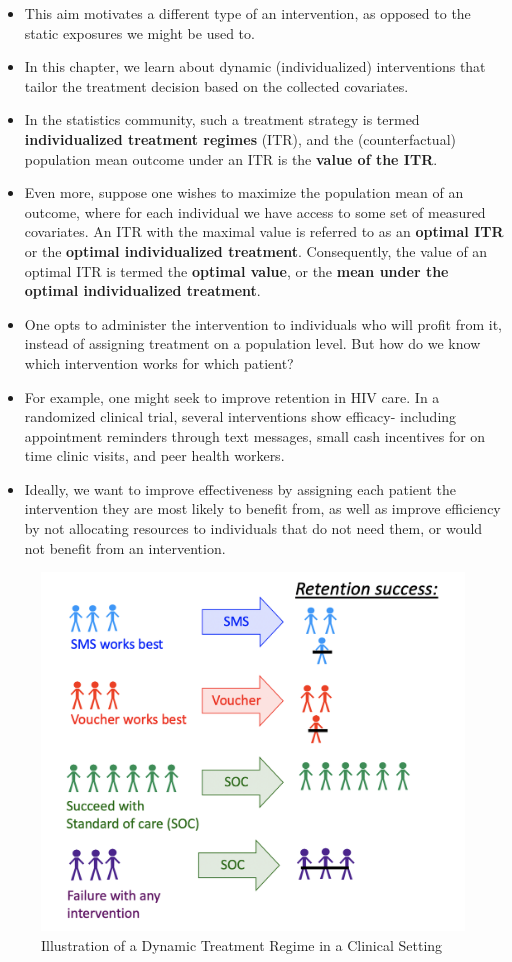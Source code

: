 \documentclass[
  12pt, krantz2,
]{book}
\theoremstyle{definition}
\theoremstyle{definition}
\theoremstyle{definition}
\newcommand{\1}{\mathbbm{1}}
\begin{document}
\begin{itemize}
\item
  This aim motivates a different type of an intervention, as opposed to the static
  exposures we might be used to.
\item
  In this chapter, we learn about dynamic
  (individualized) interventions that tailor the treatment decision based on the
  collected covariates.
\item
  In the statistics community, such a treatment strategy is termed
  \textbf{individualized treatment regimes} (ITR), and the (counterfactual)
  population mean outcome under an ITR is the \textbf{value of the ITR}.
\item
  Even more, suppose one wishes to maximize the population mean of an outcome,
  where for each individual we have access to some set of measured covariates.
  An ITR with the maximal value is referred to as an \textbf{optimal ITR} or the
  \textbf{optimal individualized treatment}. Consequently, the value of an optimal
  ITR is termed the \textbf{optimal value}, or the \textbf{mean under the optimal
  individualized treatment}.
\item
  One opts to administer the intervention to individuals who will profit from
  it, instead of assigning treatment on a population level. But how do we know
  which intervention works for which patient?
\item
  For example, one might seek to improve retention in HIV care. In a randomized
  clinical trial, several interventions show efficacy- including appointment
  reminders through text messages, small cash incentives for on time clinic
  visits, and peer health workers.
\item
  Ideally, we want to improve effectiveness by assigning each patient the
  intervention they are most likely to benefit from, as well as improve
  efficiency by not allocating resources to individuals that do not need them,
  or would not benefit from an intervention.
\end{itemize}

\begin{figure}

{\centering \includegraphics[width=0.6\linewidth]{img/png/DynamicA_Illustration} 

}

\caption{Illustration of a Dynamic Treatment Regime in a Clinical Setting}\label{fig:unnamed-chunk-1}
\end{figure}
\end{document}
